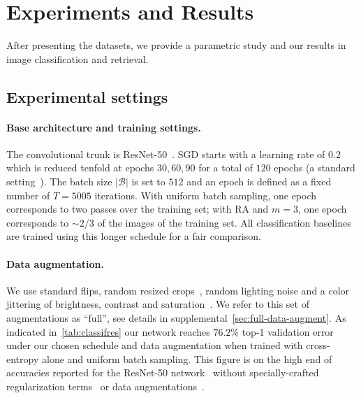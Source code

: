 %

\section{Experiments and Results\label{sec:experiments}}

After presenting the datasets, we provide a parametric study and our results in image classification and retrieval.


\subsection{Experimental settings\label{sec:experimental-settings}}
\paragraph{Base architecture and training settings.}

The convolutional trunk is ResNet-50~\cite{he16resnet}. 
SGD starts with a learning rate of $0.2$ which is reduced tenfold at epochs $30, 60, 90$ for a total of $120$ epochs (a standard setting~\cite{paszke2017automatic}). 
%
The batch size $|\mathcal{B}|$ is set to $512$ and an epoch is defined as a fixed number of $T=5005$ iterations. With uniform batch sampling, one epoch corresponds to two passes over the training set; with RA and $m=3$, one epoch corresponds to $\sim 2/3$ of the images of the training set. 
All classification baselines are trained using this longer schedule for a fair comparison. 

\paragraph{Data augmentation.} We use standard flips, random resized crops~\cite{howard2013some}, random lighting noise and a color jittering of brightness, contrast and saturation~\cite{krizhevsky2012imagenet,howard2013some}. 
We refer to this set of augmentations as ``full'', see details in supplemental~\ref{sec:full-data-augment}. 
As indicated in~\cref{tab:classifres} our network reaches $76.2$\% top-1 validation error under our chosen schedule and data augmentation when trained with cross-entropy alone and uniform batch sampling. 
This figure is on the high end of accuracies reported for the ResNet-50 network~\cite{goyal2017accurate,he16resnet} without specially-crafted regularization terms~\cite{zhang2018mixup} or data augmentations~\cite{cubuk2018autoaugment}. 


